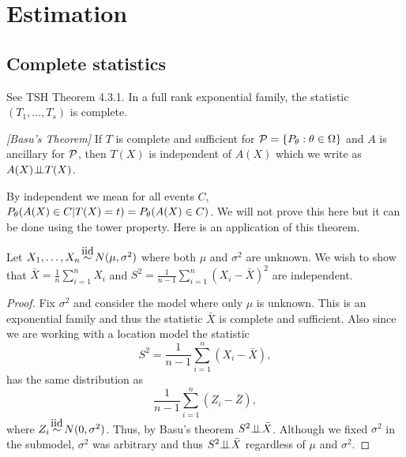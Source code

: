 \section{Estimation}
\subsection{Complete statistics}
See TSH Theorem 4.3.1. In a full rank exponential family, the statistic $(T_1,\ldots, T_s)$ is complete. 
\begin{thrm}
    \emph{[Basu's Theorem]} If $T$ is complete and sufficient for ${\mathcal{P}} = \{P_{\theta} : {\theta} \in {{\Omega}} \}$ and $A$ is ancillary for ${\mathcal{P}}$, then $T(X)$ is independent of $A(X)$ which we write as $A(X) {\perp\!\!\!\perp} T(X)$.
\end{thrm}
By independent we mean for all events $C$, $P_{\theta}(A(X) \in C|T(X)=t) = P_{\theta}(A(X) \in C)$. We will not prove this here but it can be done using the tower property. Here is an application of this theorem.
\begin{ex}
    Let $X_1,\ldots,X_n \iid N(\mu,\sigma^2)$ where both $\mu$ and $\sigma^2$ are unknown. We wish to show that $\bar{X} = \frac{1}{n}\sum_{i=1}^n X_i$ and $S^2 = \frac{1}{n-1}\sum_{i=1}^n (X_i-\bar{X})^2$ are independent.
    \begin{proof}
        Fix $\sigma^2$ and consider the model where only $\mu$ is unknown. This is an exponential family and thus the statistic $\bar{X}$ is complete and sufficient. Also since we are working with a location model the statistic 
        \[ S^2 = \frac{1}{n-1}\sum_{i=1}^n (X_i-\bar{X}),\]
        has the same distribution as 
        \[ \frac{1}{n-1}\sum_{i=1}^n (Z_i-\bar{Z}),\]
        where $Z_i \iid N(0,\sigma^2)$. Thus, by Basu's theorem $S^2 {\perp\!\!\!\perp} \bar{X}$. Although we fixed $\sigma^2$ in the submodel, $\sigma^2$ was arbitrary and thus $S^2 {\perp\!\!\!\perp} \bar{X}$ regardless of $\mu$ and $\sigma^2$.
    \end{proof}
\end{ex}
